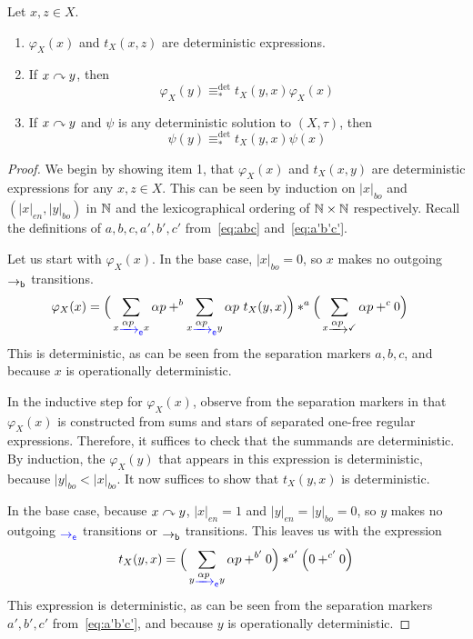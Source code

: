 \documentclass[orivec,envcountsect,envcountsame]{llncs}
\begin{document}
\begin{lemma}\label{lem:deterministic_solution_properties}
	Let \(x,z \in X\).
	\begin{enumerate}
		\item \(\varphi_X(x)\) and \(t_X(x,z)\) are deterministic expressions.
		\item If \(x \mathrel{\curvearrowright} y\), then \[
			\varphi_X(y) \equiv_*^{\det} t_X(y,x)\varphi_X(x)
		\]
		\item If \(x \mathrel{\curvearrowright} y\) and \(\psi\) is any deterministic solution to \((X,\tau)\), then \[
			\psi(y) \equiv_*^{\det} t_X(y,x)\psi(x)
		\]
	\end{enumerate}
\end{lemma}

\begin{proof}
	We begin by showing item 1, that \(\varphi_X(x)\) and \(t_X(x,y)\) are deterministic expressions for any \(x,z \in X\).
	This can be seen by induction on \(|x|_{bo}\) and \((|x|_{en}, |y|_{bo})\) in \(\mathbb{N}\) and the lexicographical ordering of \(\mathbb{N}\times\mathbb{N}\) respectively.
	Recall the definitions of \(a,b,c,a',b',c'\) from~\eqref{eq:abc} and~\eqref{eq:a'b'c'}.

	Let us start with \(\varphi_X(x)\).
	In the base case, \(|x|_{bo} = 0\), so \(x\) makes no outgoing \(\bo\) transitions.
	\begin{align*}
		\varphi_X(x)
		&= \Big(\sum_{x \etr{\alpha p} x} \alpha p +^b \sum_{x \etr{\alpha p} y} \alpha p~t_X(y, x)\Big) *^a \Big(\sum_{x \tr{\alpha p} \checkmark} \alpha p +^c 0\Big)
	\end{align*}
	This is deterministic, as can be seen from the separation markers \(a,b,c\), and because \(x\) is operationally deterministic.

	In the inductive step for \(\varphi_X(x)\), observe from the separation markers in  that \(\varphi_X(x)\) is constructed from sums and stars of separated one-free regular expressions.
	Therefore, it suffices to check that the summands are deterministic.
	By induction, the \(\varphi_X(y)\) that appears in this expression is deterministic, because \(|y|_{bo} < |x|_{bo}\).
	It now suffices to show that \(t_X(y, x)\) is deterministic.

	In the base case, because \(x \mathrel{\curvearrowright} y\), \(|x|_{en} = 1\) and \(|y|_{en} = |y|_{bo} = 0\), so \(y\) makes no outgoing \(\eo\) transitions or \(\bo\) transitions.
	This leaves us with the expression
	\[
		t_X(y, x) = \Big(\sum_{y \etr{\alpha p} y} \alpha p +^{b'} 0\Big) *^{a'} \Big(0 +^{c'} 0\Big)
	\]
	This expression is deterministic, as can be seen from the separation markers \(a',b',c'\) from~\eqref{eq:a'b'c'}, and because \(y\) is operationally deterministic.


\end{proof}
\end{document}
